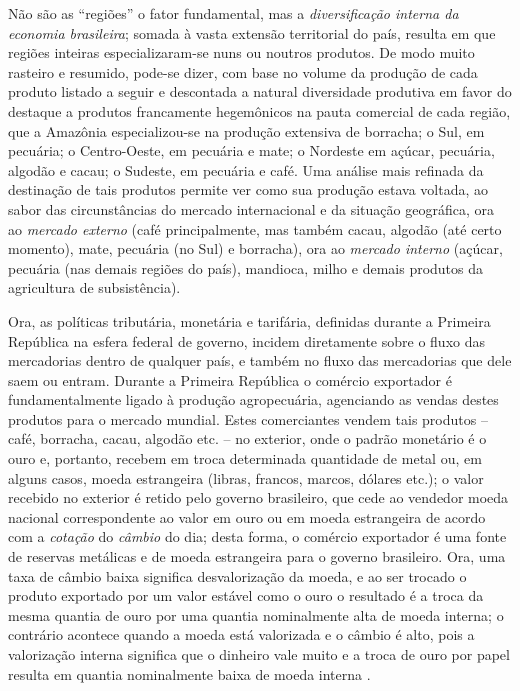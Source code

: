Não são as ``regiões'' o fator fundamental, mas a \textit{diversificação interna da economia brasileira}; somada à vasta extensão territorial do país, resulta em que regiões inteiras especializaram-se nuns ou noutros produtos. De modo muito rasteiro e resumido, pode-se dizer, com base no volume da produção de cada produto listado a seguir e descontada a natural diversidade produtiva em favor do destaque a produtos francamente hegemônicos na pauta comercial de cada região, que a Amazônia especializou-se na produção extensiva de borracha; o Sul, em pecuária; o Centro-Oeste, em pecuária e mate; o Nordeste em açúcar, pecuária, algodão e cacau; o Sudeste, em pecuária e café. Uma análise mais refinada da destinação de tais produtos permite ver como sua produção estava voltada, ao sabor das circunstâncias do mercado internacional e da situação geográfica, ora ao \textit{mercado externo} (café principalmente, mas também cacau, algodão (até certo momento), mate, pecuária (no Sul) e borracha), ora ao \textit{mercado interno} (açúcar, pecuária (nas demais regiões do país), mandioca, milho e demais produtos da agricultura de subsistência). 

Ora, as políticas tributária, monetária e tarifária, definidas durante a Primeira República na esfera federal de governo, incidem diretamente sobre o fluxo das mercadorias dentro de qualquer país, e também no fluxo das mercadorias que dele saem ou entram. Durante a Primeira República o comércio exportador é fundamentalmente ligado à produção agropecuária, agenciando as vendas destes produtos para o mercado mundial. Estes comerciantes vendem tais produtos -- café, borracha, cacau, algodão etc. -- no exterior, onde o padrão monetário é o ouro e, portanto, recebem em troca determinada quantidade de metal ou, em alguns casos, moeda estrangeira (libras, francos, marcos, dólares etc.); o valor recebido no exterior é retido pelo governo brasileiro, que cede ao vendedor moeda nacional correspondente ao valor em ouro ou em moeda estrangeira de acordo com a \textit{cotação} do \textit{câmbio} do dia; desta forma, o comércio exportador é uma fonte de reservas metálicas e de moeda estrangeira para o governo brasileiro. Ora, uma taxa de câmbio baixa significa desvalorização da moeda, e ao ser trocado o produto exportado por um valor estável como o ouro o resultado é a troca da mesma quantia de ouro por uma quantia nominalmente alta de moeda interna; o contrário acontece quando a moeda está valorizada e o câmbio é alto, pois a valorização interna significa que o dinheiro vale muito e a troca de ouro por papel resulta em quantia nominalmente baixa de moeda interna \cite[p.~99]{CARONE1970inst}. 

